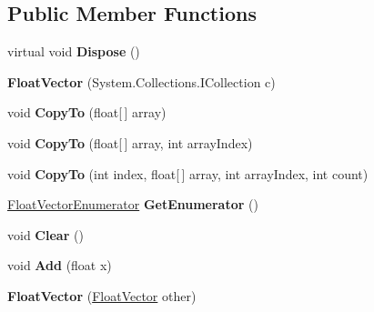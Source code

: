 \subsection*{Public Member Functions}
\begin{DoxyCompactItemize}
\item 
\hypertarget{class_float_vector_acea103f86cdff246dc6f7962b40c581c}{virtual void {\bfseries Dispose} ()}\label{class_float_vector_acea103f86cdff246dc6f7962b40c581c}

\item 
\hypertarget{class_float_vector_aa9a869fde55b1338428ea21f909ee6d1}{{\bfseries Float\+Vector} (System.\+Collections.\+I\+Collection c)}\label{class_float_vector_aa9a869fde55b1338428ea21f909ee6d1}

\item 
\hypertarget{class_float_vector_ad8ac66355dfc35f5c64eb5724b96b3fe}{void {\bfseries Copy\+To} (float\mbox{[}$\,$\mbox{]} array)}\label{class_float_vector_ad8ac66355dfc35f5c64eb5724b96b3fe}

\item 
\hypertarget{class_float_vector_a1f4a1b6cdd8c70b972c9b0cd43dc4479}{void {\bfseries Copy\+To} (float\mbox{[}$\,$\mbox{]} array, int array\+Index)}\label{class_float_vector_a1f4a1b6cdd8c70b972c9b0cd43dc4479}

\item 
\hypertarget{class_float_vector_a3522b2e8f58de147251fecb0fb8658c6}{void {\bfseries Copy\+To} (int index, float\mbox{[}$\,$\mbox{]} array, int array\+Index, int count)}\label{class_float_vector_a3522b2e8f58de147251fecb0fb8658c6}

\item 
\hypertarget{class_float_vector_af264a9af414fc2b0aa6bf98227b1fabf}{\hyperlink{class_float_vector_1_1_float_vector_enumerator}{Float\+Vector\+Enumerator} {\bfseries Get\+Enumerator} ()}\label{class_float_vector_af264a9af414fc2b0aa6bf98227b1fabf}

\item 
\hypertarget{class_float_vector_ab024e68685eb8095eb1692185aef03e0}{void {\bfseries Clear} ()}\label{class_float_vector_ab024e68685eb8095eb1692185aef03e0}

\item 
\hypertarget{class_float_vector_a3cc346b929442c980fa5d8940b02af81}{void {\bfseries Add} (float x)}\label{class_float_vector_a3cc346b929442c980fa5d8940b02af81}

\item 
\hypertarget{class_float_vector_a42fe509f94189b4b210aa13f3082901b}{{\bfseries Float\+Vector} (\hyperlink{class_float_vector}{Float\+Vector} other)}\label{class_float_vector_a42fe509f94189b4b210aa13f3082901b}


\end{DoxyCompactItemize}
